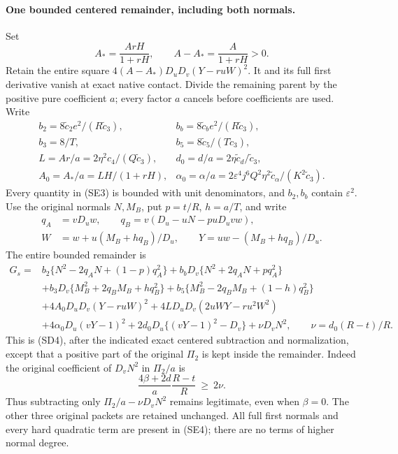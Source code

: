 \paragraph{One bounded centered remainder, including both normals.}
Set
\[
 A_* =\frac{ArH}{1+rH},\qquad
 A-A_* =\frac{A}{1+rH}>0.                              \tag{SE2}
\]
Retain the entire square $4(A-A_*)D_uD_v(Y-r uW)^2$.
It and its full first derivative vanish at exact native contact.
Divide the remaining parent by the positive pure coefficient $a$;
every factor $a$ cancels before coefficients are used. Write
\[
 \begin{array}{ll}
 b_2=8\widetilde c_2e^2/(R\widetilde c_3),&
 b_b=8\widetilde c_be^2/(R\widetilde c_3),\\
 b_3=8/T,&b_5=8\widetilde c_5/(T\widetilde c_3),\\
 L=Ar/a=2\eta^2c_4/(Q\widetilde c_3),&
 d_0=d/a=2\eta\widetilde c_d/\widetilde c_3,\\
 A_0=A_*/a=LH/(1+rH),&
 \alpha_0=\alpha/a=2\varepsilon^4j^6Q^2\eta^2
       \widetilde c_\alpha/(K^2\widetilde c_3).
 \end{array}                                                     \tag{SE3}
\]
Every quantity in (SE3) is bounded with unit denominators, and
$b_2,b_b$ contain $\varepsilon^2$.
Use the original normals $N,M_B$, put $p=t/R$, $h=a/T$, and write
\begin{align*}
 q_A&=vD_uw,\qquad q_B=v(D_u-uN-puD_uv w),\\
 W&=w+u(M_B+hq_B)/D_u,\qquad Y=uw-(M_B+hq_B)/D_u.
\end{align*}
The entire bounded remainder is
\begin{align*}
G_s={}&b_2\{N^2-2q_AN+(1-p)q_A^2\}
 +b_bD_v\{N^2+2q_AN+pq_A^2\}\\
 &+b_3D_v\{M_B^2+2q_BM_B+hq_B^2\}
 +b_5\{M_B^2-2q_BM_B+(1-h)q_B^2\}\\
 &+4A_0D_uD_v(Y-r uW)^2
 +4LD_uD_v(2uWY-r u^2W^2)\\
 &+4\alpha_0D_u(vY-1)^2
 +2d_0D_u\{(vY-1)^2-D_v\}
 +\nu D_vN^2,\qquad \nu=d_0(R-t)/R.                 \tag{SE4}
\end{align*}
This is (SD4), after the indicated exact centered subtraction and
normalization, except that a positive part of the original $\Pi_2$ is
kept inside the remainder. Indeed the original coefficient of
$D_vN^2$ in $\Pi_2/a$ is
\[
 \frac{4\beta+2d}{a}\frac{R-t}{R}\ \ge\ 2\nu.
\]
Thus subtracting only $\Pi_2/a-\nu D_vN^2$ remains legitimate, even
when $\beta=0$. The other three original packets are retained unchanged.
All full first normals and every hard quadratic term are present in
(SE4); there are no terms of higher normal degree.

